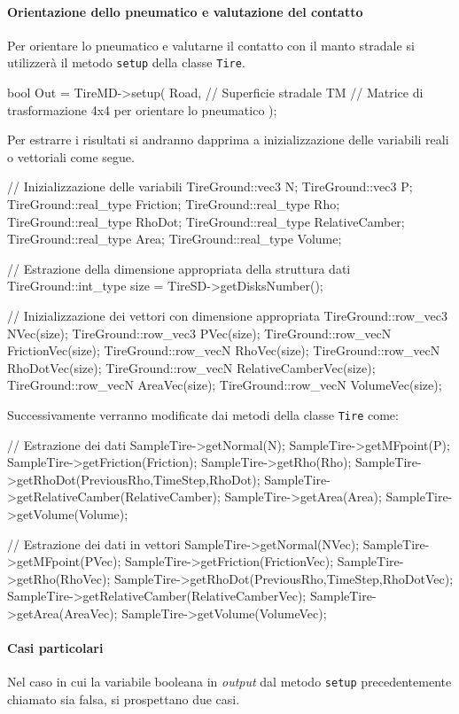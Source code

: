 \paragraph{Orientazione dello pneumatico e valutazione del contatto}
Per orientare lo pneumatico e valutarne il contatto con il manto stradale si utilizzerà il metodo \texttt{setup} della classe \texttt{Tire}.
\begin{pseudoc}
bool Out = TireMD->setup(
	Road, // Superficie stradale
	TM    // Matrice di trasformazione 4x4 per orientare lo pneumatico
	);
\end{pseudoc}
Per estrarre i risultati si andranno dapprima a inizializzazione delle variabili reali o vettoriali come segue.
\begin{pseudoc}
	// Inizializzazione delle variabili
	TireGround::vec3 N;
	TireGround::vec3 P;
	TireGround::real_type Friction;
	TireGround::real_type Rho;
	TireGround::real_type RhoDot;
	TireGround::real_type RelativeCamber;
	TireGround::real_type Area;
	TireGround::real_type Volume;
	
	// Estrazione della dimensione appropriata della struttura dati
	TireGround::int_type size = TireSD->getDisksNumber();
	
	// Inizializzazione dei vettori con dimensione appropriata
	TireGround::row_vec3 NVec(size);
	TireGround::row_vec3 PVec(size);
	TireGround::row_vecN FrictionVec(size);
	TireGround::row_vecN RhoVec(size);
	TireGround::row_vecN RhoDotVec(size);
	TireGround::row_vecN RelativeCamberVec(size);
	TireGround::row_vecN AreaVec(size);
	TireGround::row_vecN VolumeVec(size);
\end{pseudoc}
Successivamente verranno modificate dai metodi della classe \texttt{Tire} come:
\begin{pseudoc}
	// Estrazione dei dati
	SampleTire->getNormal(N);
	SampleTire->getMFpoint(P);
	SampleTire->getFriction(Friction);
	SampleTire->getRho(Rho);
	SampleTire->getRhoDot(PreviousRho,TimeStep,RhoDot);
	SampleTire->getRelativeCamber(RelativeCamber);
	SampleTire->getArea(Area);
	SampleTire->getVolume(Volume);
	
	// Estrazione dei dati in vettori
	SampleTire->getNormal(NVec);
	SampleTire->getMFpoint(PVec);
	SampleTire->getFriction(FrictionVec);
	SampleTire->getRho(RhoVec);
	SampleTire->getRhoDot(PreviousRho,TimeStep,RhoDotVec);
	SampleTire->getRelativeCamber(RelativeCamberVec);
	SampleTire->getArea(AreaVec);
	SampleTire->getVolume(VolumeVec);
\end{pseudoc}
%
\paragraph{Casi particolari}
Nel caso in cui la variabile booleana in \textit{output} dal metodo \texttt{setup} precedentemente chiamato sia falsa, si prospettano due casi.
%
